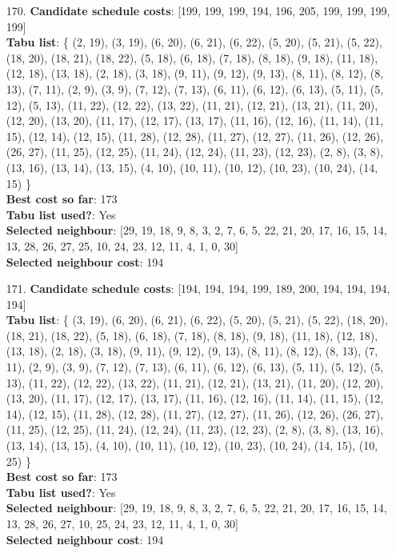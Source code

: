 \documentclass[fleqn]{article}
\begin{document}
\begin{itemize}
    \item[170.] \textbf{Candidate schedule costs}: [199, 199, 199, 194, 196, 205, 199, 199, 199, 199] \\
    \textbf{Tabu list}: \{ (2, 19), (3, 19), (6, 20), (6, 21), (6, 22), (5, 20), (5, 21), (5, 22), (18, 20), (18, 21), (18, 22), (5, 18), (6, 18), (7, 18), (8, 18), (9, 18), (11, 18), (12, 18), (13, 18), (2, 18), (3, 18), (9, 11), (9, 12), (9, 13), (8, 11), (8, 12), (8, 13), (7, 11), (2, 9), (3, 9), (7, 12), (7, 13), (6, 11), (6, 12), (6, 13), (5, 11), (5, 12), (5, 13), (11, 22), (12, 22), (13, 22), (11, 21), (12, 21), (13, 21), (11, 20), (12, 20), (13, 20), (11, 17), (12, 17), (13, 17), (11, 16), (12, 16), (11, 14), (11, 15), (12, 14), (12, 15), (11, 28), (12, 28), (11, 27), (12, 27), (11, 26), (12, 26), (26, 27), (11, 25), (12, 25), (11, 24), (12, 24), (11, 23), (12, 23), (2, 8), (3, 8), (13, 16), (13, 14), (13, 15), (4, 10), (10, 11), (10, 12), (10, 23), (10, 24), (14, 15) \} \\
    \textbf{Best cost so far}: 173 \\
    \textbf{Tabu list used?}: Yes \\
    \textbf{Selected neighbour}: [29, 19, 18, 9, 8, 3, 2, 7, 6, 5, 22, 21, 20, 17, 16, 15, 14, 13, 28, 26, 27, 25, 10, 24, 23, 12, 11, 4, 1, 0, 30] \\
    \textbf{Selected neighbour cost}: 194
      

    \item[171.] \textbf{Candidate schedule costs}: [194, 194, 194, 199, 189, 200, 194, 194, 194, 194] \\
    \textbf{Tabu list}: \{ (3, 19), (6, 20), (6, 21), (6, 22), (5, 20), (5, 21), (5, 22), (18, 20), (18, 21), (18, 22), (5, 18), (6, 18), (7, 18), (8, 18), (9, 18), (11, 18), (12, 18), (13, 18), (2, 18), (3, 18), (9, 11), (9, 12), (9, 13), (8, 11), (8, 12), (8, 13), (7, 11), (2, 9), (3, 9), (7, 12), (7, 13), (6, 11), (6, 12), (6, 13), (5, 11), (5, 12), (5, 13), (11, 22), (12, 22), (13, 22), (11, 21), (12, 21), (13, 21), (11, 20), (12, 20), (13, 20), (11, 17), (12, 17), (13, 17), (11, 16), (12, 16), (11, 14), (11, 15), (12, 14), (12, 15), (11, 28), (12, 28), (11, 27), (12, 27), (11, 26), (12, 26), (26, 27), (11, 25), (12, 25), (11, 24), (12, 24), (11, 23), (12, 23), (2, 8), (3, 8), (13, 16), (13, 14), (13, 15), (4, 10), (10, 11), (10, 12), (10, 23), (10, 24), (14, 15), (10, 25) \} \\
    \textbf{Best cost so far}: 173 \\
    \textbf{Tabu list used?}: Yes \\
    \textbf{Selected neighbour}: [29, 19, 18, 9, 8, 3, 2, 7, 6, 5, 22, 21, 20, 17, 16, 15, 14, 13, 28, 26, 27, 10, 25, 24, 23, 12, 11, 4, 1, 0, 30] \\
    \textbf{Selected neighbour cost}: 194
      


\end{itemize}
\end{document}
